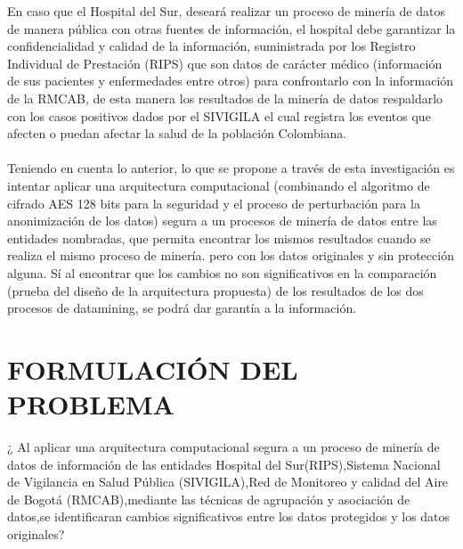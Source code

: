 \documentclass[a4paper,openright,12pt]{book}
\theoremstyle{definition}
\theoremstyle{remark}
\begin{document}
En caso que el Hospital del Sur, deseará realizar un proceso de minería de datos de manera pública con otras fuentes de información, el hospital debe garantizar la confidencialidad y calidad de la información, suministrada por los Registro Individual de Prestación (RIPS) que son datos de carácter médico (información de sus pacientes y enfermedades entre otros) para confrontarlo con la información de la RMCAB, de esta manera los resultados de la minería de datos respaldarlo con los casos positivos dados por el SIVIGILA el cual registra los eventos que afecten o puedan afectar la salud de la población Colombiana.\\\\
Teniendo  en cuenta lo anterior, lo  que se propone  a través de  esta investigación es intentar aplicar una arquitectura computacional (combinando el algoritmo de cifrado AES 128 bits para la seguridad y el proceso de perturbación para la anonimización de los datos) segura a un procesos de minería de datos entre las entidades nombradas, que  permita encontrar los mismos resultados cuando se realiza el mismo proceso de minería. pero con los datos originales y sin protección alguna. Sí al encontrar que los cambios no son significativos en la comparación (prueba del diseño de la arquitectura propuesta) de los resultados de los dos procesos de datamining, se podrá dar garantía a la información.

\section{FORMULACIÓN DEL PROBLEMA}

¿ Al aplicar una arquitectura computacional segura a un proceso de minería de datos de información de las entidades Hospital del Sur(RIPS),Sistema Nacional de Vigilancia en Salud Pública (SIVIGILA),Red de Monitoreo y calidad del Aire de Bogotá (RMCAB),mediante las técnicas de agrupación y asociación de datos,se identificaran cambios significativos entre los datos protegidos y los datos originales?
\end{document}
